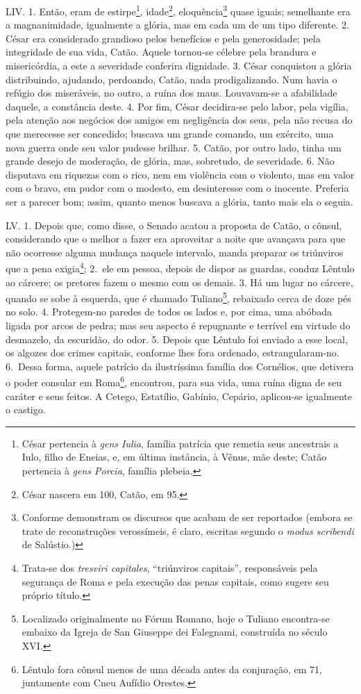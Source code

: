 LIV. 1. Então, eram de estirpe\footnote{César pertencia à \emph{gens Iulia},
família patrícia que remetia seus ancestrais a Iulo, filho de Eneias, e, em
última instância, à Vênus, mãe deste; Catão pertencia à \emph{gens Porcia},
família plebeia.}, idade\footnote{César nascera em 100, Catão, em 95.},
eloquência\footnote{Conforme demonstram os discursos que acabam de ser
reportados (embora se trate de reconstruções verossímeis, é claro, escritas
segundo o \emph{modus scribendi} de Salústio.)} quase iguais; semelhante era a
magnanimidade, igualmente a glória, mas em cada um de um tipo diferente. 2.
César era considerado grandioso pelos benefícios e pela generosidade; pela
integridade de sua vida, Catão. Aquele tornou-se célebre pela brandura e
misericórdia, a este a severidade conferira dignidade. 3. César conquistou a
glória distribuindo, ajudando, perdoando, Catão, nada prodigalizando. Num havia
o refúgio dos miseráveis, no outro, a ruína dos maus. Louvavam-se a afabilidade
daquele, a constância deste. 4. Por fim, César decidira-se pelo labor, pela
vigília, pela atenção aos negócios dos amigos em negligência dos seus, pela não
recusa do que merecesse ser concedido; buscava um grande comando, um exército,
uma nova guerra onde seu valor pudesse brilhar. 5. Catão, por outro lado, tinha
um grande desejo de moderação, de glória, mas, sobretudo, de severidade. 6. Não
disputava em riquezas com o rico, nem em violência com o violento, mas em valor
com o bravo, em pudor com o modesto, em desinteresse com o inocente. Preferia
ser a parecer bom; assim, quanto menos buscava a glória, tanto mais ela o
seguia. 

LV. 1. Depois que, como disse, o Senado acatou a proposta de Catão, o cônsul,
considerando que o melhor a fazer era aproveitar a noite que avançava para que
não ocorresse alguma mudança naquele intervalo, manda preparar os triúnviros
que a pena exigia\footnote{Trata-se dos \emph{tresviri capitales}, ``triúnviros
capitais'', responsáveis pela segurança de Roma e pela execução das penas
capitais, como sugere seu próprio título.}; 2.~ele em pessoa, depois de dispor
as guardas, conduz Lêntulo ao cárcere; os pretores fazem o mesmo com os demais.
3. Há um lugar no cárcere, quando se sobe à esquerda, que é chamado
Tuliano\footnote{Localizado originalmente no Fórum Romano, hoje o Tuliano
encontra-se embaixo da Igreja de San Giuseppe dei Falegnami, construída no
século XVI.}, rebaixado cerca de doze pés no solo. 4. Protegem-no paredes de
todos os lados e, por cima, uma abóbada ligada por arcos de pedra; mas seu
aspecto é repugnante e terrível em virtude do desmazelo, da escuridão, do odor.
5. Depois que Lêntulo foi enviado a esse local, os algozes dos crimes capitais,
conforme lhes fora ordenado, estrangularam-no. 6.~Dessa forma, aquele patrício
da ilustríssima família dos Cornélios, que detivera o poder consular em
Roma\footnote{Lêntulo fora cônsul menos de uma década antes da conjuração, em
71, juntamente com Cneu Aufídio Orestes.}, encontrou, para sua vida, uma ruína
digna de seu caráter e seus feitos. A Cetego, Estatílio, Gabínio, Cepário,
aplicou-se igualmente o castigo.

